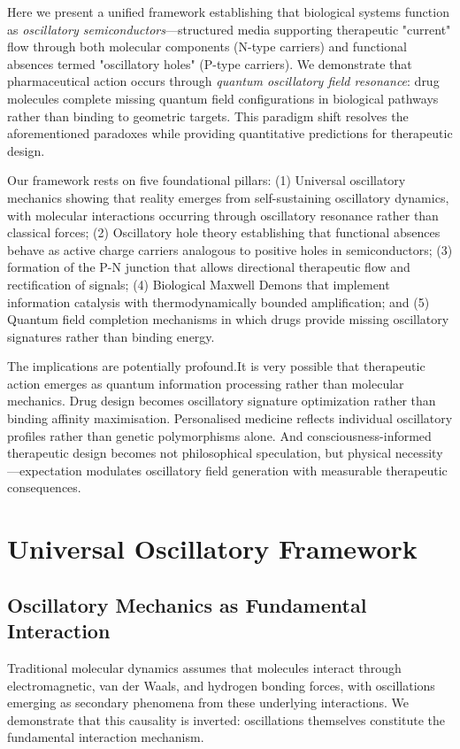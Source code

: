 \documentclass{article}
\theoremstyle{definition}
\theoremstyle{remark}
\begin{document}
Here we present a unified framework establishing that biological systems function as \textit{oscillatory semiconductors}—structured media supporting therapeutic "current" flow through both molecular components (N-type carriers) and functional absences termed "oscillatory holes" (P-type carriers). We demonstrate that pharmaceutical action occurs through \textit{quantum oscillatory field resonance}: drug molecules complete missing quantum field configurations in biological pathways rather than binding to geometric targets. This paradigm shift resolves the aforementioned paradoxes while providing quantitative predictions for therapeutic design.


Our framework rests on five foundational pillars: (1) Universal oscillatory mechanics showing that reality emerges from self-sustaining oscillatory dynamics, with molecular interactions occurring through oscillatory resonance rather than classical forces; (2) Oscillatory hole theory establishing that functional absences behave as active charge carriers analogous to positive holes in semiconductors; (3) formation of the P-N junction that allows directional therapeutic flow and rectification of signals; (4) Biological Maxwell Demons that implement information catalysis with thermodynamically bounded amplification; and (5) Quantum field completion mechanisms in which drugs provide missing oscillatory signatures rather than binding energy.

The implications are potentially profound.It is very possible that therapeutic action emerges as quantum information processing rather than molecular mechanics. Drug design becomes oscillatory signature optimization rather than binding affinity maximisation. Personalised medicine reflects individual oscillatory profiles rather than genetic polymorphisms alone. And consciousness-informed therapeutic design becomes not philosophical speculation, but physical necessity—expectation modulates oscillatory field generation with measurable therapeutic consequences.

\section{Universal Oscillatory Framework}

\subsection{Oscillatory Mechanics as Fundamental Interaction}

Traditional molecular dynamics assumes that molecules interact through electromagnetic, van der Waals, and hydrogen bonding forces, with oscillations emerging as secondary phenomena from these underlying interactions\cite{Goldstein2002,Arnold1978}. We demonstrate that this causality is inverted: oscillations themselves constitute the fundamental interaction mechanism.
\end{document}
